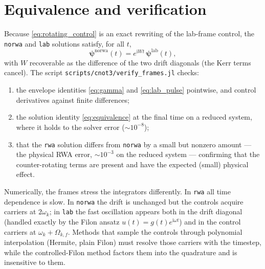\documentclass[11pt]{article}
\newcommand{\ii}{\mathrm{i}}
\newcommand{\code}[1]{\texttt{#1}}
\begin{document}
\section{Equivalence and verification}

Because \eqref{eq:rotating_control} is an exact rewriting of the lab-frame
control, the \code{norwa} and \code{lab} solutions satisfy, for all $t$,
\begin{equation} \label{eq:equivalence}
    \bm\psi^{\mathrm{norwa}}(t) = e^{\ii W t}\, \bm\psi^{\mathrm{lab}}(t),
\end{equation}
with $W$ recoverable as the difference of the two drift diagonals (the Kerr
terms cancel).  The script \code{scripts/cnot3/verify\_frames.jl} checks:
\begin{enumerate}
    \item the envelope identities \eqref{eq:gamma} and \eqref{eq:lab_pulse}
        pointwise, and control derivatives against finite differences;
    \item the solution identity \eqref{eq:equivalence} at the final time on a
        reduced system, where it holds to the solver error
        ($\sim 10^{-8}$);
    \item that the \code{rwa} solution differs from \code{norwa} by a small
        but nonzero amount --- the physical RWA error, $\sim 10^{-3}$ on the
        reduced system --- confirming that the counter-rotating terms are
        present and have the expected (small) physical effect.
\end{enumerate}

Numerically, the frames stress the integrators differently.  In \code{rwa}
all time dependence is slow.  In \code{norwa} the drift is unchanged but the
controls acquire carriers at $2\omega_k$; in \code{lab} the fast oscillation
appears both in the drift diagonal (handled exactly by the Filon ansatz
$u(t) = g(t)e^{\ii\omega t}$) and in the control carriers at
$\omega_k + \Omega_{k,f}$.  Methods that sample the controls through
polynomial interpolation (Hermite, plain Filon) must resolve those carriers
with the timestep, while the controlled-Filon method factors them into the
quadrature and is insensitive to them.
\end{document}
